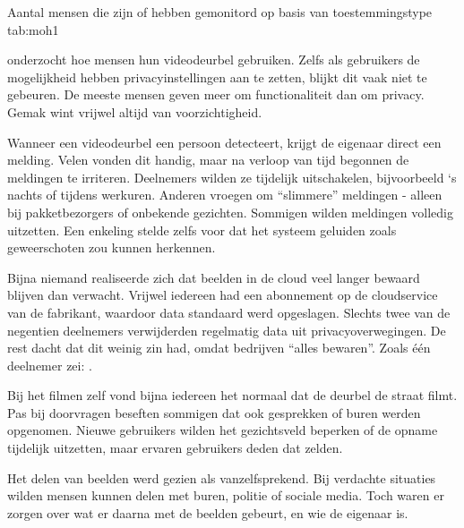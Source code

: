 \documentclass[nonacm, sigconf, balance=true]{acmart}
\begin{document}
    \begin{SimpleTable}[s{0.3}s{0.3}s{0.3}s{0.3}]{Aantal mensen die zijn of hebben gemonitord op basis van toestemmingstype \parencite{moh2023characterizing}}{tab:moh1}
        \TableEmpty{}
    \end{SimpleTable}

    \parencite{tabassum2023exploring} onderzocht hoe mensen hun videodeurbel gebruiken.
    Zelfs als gebruikers de mogelijkheid hebben privacyinstellingen aan te zetten, blijkt dit vaak niet te gebeuren.
    De meeste mensen geven meer om functionaliteit dan om privacy.
    Gemak wint vrijwel altijd van voorzichtigheid.

    Wanneer een videodeurbel een persoon detecteert, krijgt de eigenaar direct een melding.
    Velen vonden dit handig, maar na verloop van tijd begonnen de meldingen te irriteren.
    Deelnemers wilden ze tijdelijk uitschakelen, bijvoorbeeld `s nachts of tijdens werkuren.
    Anderen vroegen om ``slimmere'' meldingen - alleen bij pakketbezorgers of onbekende gezichten.
    Sommigen wilden meldingen volledig uitzetten.
    Een enkeling stelde zelfs voor dat het systeem geluiden zoals geweerschoten zou kunnen herkennen.

    Bijna niemand realiseerde zich dat beelden in de cloud veel langer bewaard blijven dan verwacht.
    Vrijwel iedereen had een abonnement op de cloudservice van de fabrikant, waardoor data standaard werd opgeslagen.
    Slechts twee van de negentien deelnemers verwijderden regelmatig data uit privacyoverwegingen.
    De rest dacht dat dit weinig zin had, omdat bedrijven ``alles bewaren''.
    Zoals één deelnemer zei:
    .

    Bij het filmen zelf vond bijna iedereen het normaal dat de deurbel de straat filmt.
    Pas bij doorvragen beseften sommigen dat ook gesprekken of buren werden opgenomen.
    Nieuwe gebruikers wilden het gezichtsveld beperken of de opname tijdelijk uitzetten, maar ervaren gebruikers deden dat zelden.

    Het delen van beelden werd gezien als vanzelfsprekend.
    Bij verdachte situaties wilden mensen kunnen delen met buren, politie of sociale media.
    Toch waren er zorgen over wat er daarna met de beelden gebeurt, en wie de eigenaar is.
\end{document}
